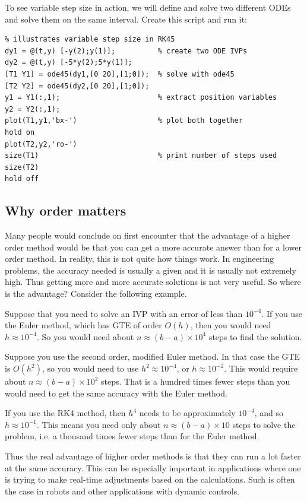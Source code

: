 To see variable step size in action, we will define and solve two different
ODEs and solve them on the same interval.
Create this script and run it:
\begin{lstlisting}
% illustrates variable step size in RK45
dy1 = @(t,y) [-y(2);y(1)];          % create two ODE IVPs
dy2 = @(t,y) [-5*y(2);5*y(1)];
[T1 Y1] = ode45(dy1,[0 20],[1;0]);  % solve with ode45
[T2 Y2] = ode45(dy2,[0 20],[1;0]);
y1 = Y1(:,1);                       % extract position variables
y2 = Y2(:,1);
plot(T1,y1,'bx-')                   % plot both together
hold on
plot(T2,y2,'ro-')
size(T1)                            % print number of steps used
size(T2)
hold off
\end{lstlisting}


\subsection*{Why order matters}

Many people would conclude on first encounter that the advantage
of a higher order method would be that you can get a more accurate
answer than for a lower order method. In reality, this is not quite
how things work. In engineering problems, the accuracy needed is
usually a given and it is usually not extremely high.
Thus getting more and more accurate solutions is
not very useful. So where is the advantage? Consider the following example.

Suppose that you need to solve an IVP with an error of less than $10^{-4}$.
If you use the Euler method, which has GTE of order $O(h)$,
then you would need $h \approx 10^{-4}$. So you would need about
$n \approx (b-a) \times 10^4$ steps to find the solution.

Suppose you use the second order, modified Euler method. In that
case the GTE is $O(h^2)$, so you would need to use $h^2 \approx 10^{-4}$, or
$h \approx 10^{-2}$. This would require about $n \approx (b-a) \times 10^2$
steps. That is a hundred times fewer steps than you would need to get
the same accuracy with the Euler method.

If you use the RK4 method, then $h^4$ needs to be approximately $10^{-4}$,
and so $h \approx 10^{-1}$. This means you need only about $n \approx (b-a)\times 10$
steps to solve the problem, i.e. a thousand times fewer steps than for the
Euler method.

Thus the real advantage of higher order methods is that they can run a lot
faster at the same accuracy. This can be especially important in applications
where one is trying to make real-time adjustments based on the calculations.
Such is often the case in robots and other applications with dynamic controls.

